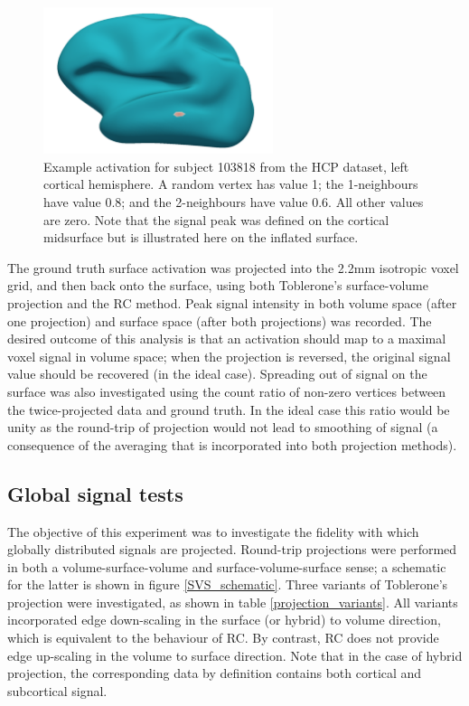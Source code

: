 \documentclass[12pt]{report}
\begin{document}
\begin{figure}
\centering
\includegraphics[width=0.6\textwidth]{activation}
\caption{Example activation for subject 103818 from the HCP dataset, left cortical hemisphere. A random vertex has value 1; the 1-neighbours have value 0.8; and the 2-neighbours have value 0.6. All other values are zero. Note that the signal peak was defined on the cortical midsurface but is illustrated here on the inflated surface.}
\label{activation_example} 
\end{figure}

The ground truth surface activation was projected into the 2.2mm isotropic voxel grid, and then back onto the surface, using both Toblerone's surface-volume projection and the RC method. Peak signal intensity in both volume space (after one projection) and surface space (after both projections) was recorded. The desired outcome of this analysis is that an activation should map to a maximal voxel signal in volume space; when the projection is reversed, the original signal value should be recovered (in the ideal case). Spreading out of signal on the surface was also investigated using the count ratio of non-zero vertices between the twice-projected data and ground truth. In the ideal case this ratio would be unity as the round-trip of projection would not lead to smoothing of signal (a consequence of the averaging that is incorporated into both projection methods). 

\subsection{Global signal tests}
The objective of this experiment was to investigate the fidelity with which globally distributed signals are projected. Round-trip projections were performed in both a volume-surface-volume and surface-volume-surface sense; a schematic for the latter is shown in figure \ref{SVS_schematic}. Three variants of Toblerone's projection were investigated, as shown in table \ref{projection_variants}. All variants incorporated edge down-scaling in the surface (or hybrid) to volume direction, which is equivalent to the behaviour of RC. By contrast, RC does not provide edge up-scaling in the volume to surface direction. Note that in the case of hybrid projection, the corresponding data by definition contains both cortical and subcortical signal. 
\end{document}
